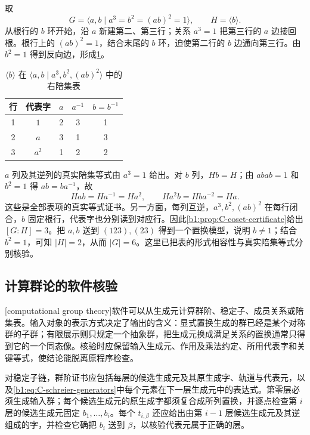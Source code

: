 \begin{example}\label{b1:exm:C-s3-cosets}
	取
	\[
		G=\langle a,b\mid a^3=b^2=(ab)^2=1\rangle,\qquad H=\langle b\rangle.
	\]
	从根行的 \(b\) 环开始，沿 \(a\) 新建第二、第三行；关系 \(a^3=1\) 把第三行的 \(a\) 边接回根。根行上的 \((ab)^2=1\)，结合末尾的 \(b\) 环，迫使第二行的 \(b\) 边通向第三行。由 \(b^2=1\) 得到反向边，形成\cref{b1:tab:C-s3-cosets}。
	\begin{table}[htbp]
		\centering
		\caption{\(\langle b\rangle\) 在 \(\langle a,b\mid a^3,b^2,(ab)^2\rangle\) 中的右陪集表}
		\label{b1:tab:C-s3-cosets}
		\begin{tabular}{ccccc}
			\toprule
			行 & 代表字 & \(a\) & \(a^{-1}\) & \(b=b^{-1}\) \\
			\midrule
			1 & \(1\) & 2 & 3 & 1 \\
			2 & \(a\) & 3 & 1 & 3 \\
			3 & \(a^2\) & 1 & 2 & 2 \\
			\bottomrule
		\end{tabular}
	\end{table}
	\(a\) 列及其逆列的真实陪集等式由 \(a^3=1\) 给出。对 \(b\) 列，\(Hb=H\)；由 \(abab=1\) 和 \(b^2=1\) 得 \(ab=ba^{-1}\)，故
	\[
		Hab=Ha^{-1}=Ha^2,\qquad Ha^2b=Hba^{-2}=Ha.
	\]
	这些是全部表项的真实等式证书。另一方面，每列互逆，\(a^3,b^2,(ab)^2\) 在每行闭合，\(b\) 固定根行，代表字也分别读到对应行。因此\cref{b1:prop:C-coset-certificate}给出 \([G:H]=3\)。把 \(a,b\) 送到 \((123),(23)\) 得到一个置换模型，说明 \(b\ne1\)；结合 \(b^2=1\)，可知 \(|H|=2\)，从而 \(|G|=6\)。这里已把表的形式相容性与真实陪集等式分别核验。
\end{example}

\subsection{计算群论的软件核验}
\label{b1:subsec:C03:06}

[computational group theory]软件可以从生成元计算群阶、稳定子、成员关系或陪集表。输入对象的表示方式决定了输出的含义：显式置换生成的群已经是某个对称群的子群；有限展示则只规定一个抽象群，把生成元换成满足关系的置换通常只得到它的一个同态像。核验时应保留输入生成元、作用及乘法约定、所用代表字和关键等式，使结论能脱离原程序检查。

\ProseParagraphBreak
对稳定子链，群阶证书应包括每层的候选生成元及其原生成字、轨道与代表元，以及\eqref{b1:eq:C-schreier-generators}中每个元素在下一层生成元中的表达式。第零层必须生成输入群；每个候选生成元的原生成字都须复合成所列置换，并逐点检查第 \(i\) 层的候选生成元固定 \(b_1,\ldots,b_i\)。每个 \(t_{i,\beta}\) 还应给出由第 \(i-1\) 层候选生成元及其逆组成的字，并检查它确把 \(b_i\) 送到 \(\beta\)，以核验代表元属于正确的层。

